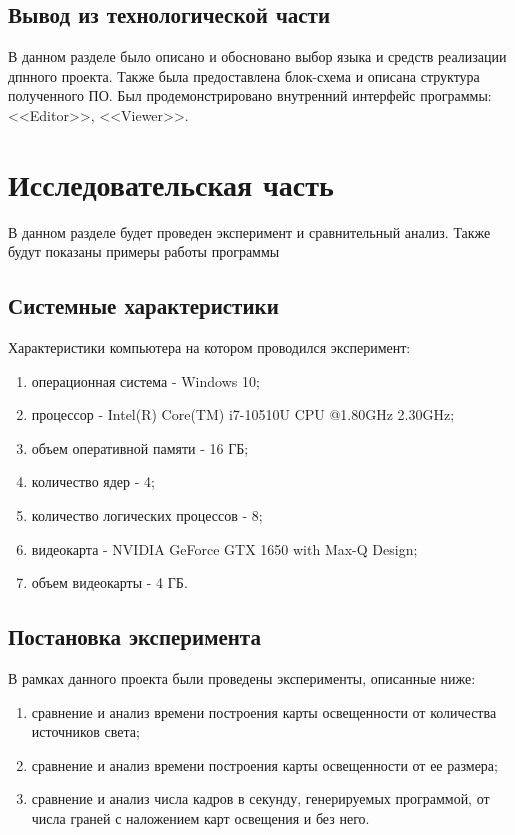 \documentclass[a4paper, 10pt]{article}
\begin{document}
	\subsection{Вывод из технологической части}
	\hspace*{5mm} В данном разделе было описано и обосновано выбор языка и средств реализации дпнного проекта. Также была предоставлена блок-схема  и описана структура полученного ПО. Был продемонстрировано внутренний интерфейс программы: <<Editor>>, <<Viewer>>.

\newpage
\section{Исследовательская часть }
	\hspace*{5mm} В данном разделе будет проведен эксперимент и сравнительный анализ. Также будут показаны примеры работы программы
	\subsection{Системные характеристики}
	Характеристики компьютера на котором проводился эксперимент:
	\begin{enumerate}
		\item операционная система - Windows 10;
		\item процессор - Intel(R) Core(TM) i7-10510U CPU @1.80GHz 2.30GHz;
		\item объем оперативной памяти - 16 ГБ;
		\item количество ядер - 4;
		\item количество логических процессов - 8;
		\item видеокарта - NVIDIA GeForce GTX 1650 with Max-Q Design;
		\item объем видеокарты - 4 ГБ.
	\end{enumerate}
	\subsection{Постановка эксперимента}
	В рамках данного проекта были проведены эксперименты, описанные ниже:
	\begin{enumerate}
		\item сравнение и анализ времени построения карты освещенности от количества источников света;
		\item сравнение и анализ времени построения карты освещенности от ее размера;
		\item сравнение и анализ числа кадров в секунду, генерируемых программой, от числа граней с наложением карт освещения и без него.
	\end{enumerate}
	
\end{document}
